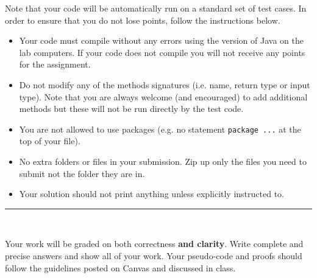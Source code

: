 \documentclass[11pt]{exam}
\begin{document}
\noindent Note that your code will be automatically run on a standard set of test cases.  In order to ensure that you do not lose points, follow the instructions below.
\begin{itemize}
\item Your code must compile without any errors using the version of Java on the lab computers.  If your code does not compile you will not receive any points for the assignment.
\item Do not modify any of the methods signatures (i.e. name, return type or input type).  Note that you are always welcome (and encouraged) to add additional methods but these will not be run directly by the test code.
\item You are not allowed to use packages (e.g. no statement \texttt{package ...} at the top of your file).
\item No extra folders or files in your submission.  Zip up only the files you need to submit not the folder they are in.
\item Your solution should not print anything unless explicitly instructed to.
\end{itemize}

\hrule
\vspace{2em}
\\

\vspace{.5em}

\noindent Your work will be graded on both correctness {\bf and clarity}.  Write complete and precise answers and show all of your work.  Your pseudo-code and proofs should follow the guidelines posted on Canvas and discussed in class.\\

 \\
   
\end{document}
